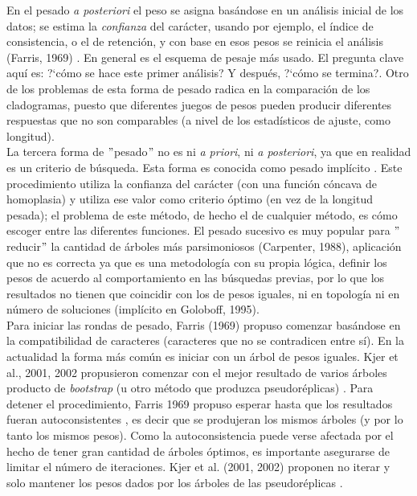 En el pesado \textit{a posteriori} el peso se asigna bas\'andose en un an\'alisis inicial de los datos; se estima la \textit{confianza} del car\'acter, usando por ejemplo, el \'indice de consistencia, o el de retenci\'on, y con base en esos pesos se reinicia el an\'alisis (Farris, 1969) \cite{Farris1969}. En general es el esquema de pesaje m\'as usado. El pregunta clave aqu\'i es: ?`c\'omo se hace este primer an\'alisis? Y despu\'es, ?`c\'omo se termina?. Otro de los problemas de esta forma de pesado radica en la comparaci\'on de los cladogramas, puesto que diferentes juegos de pesos pueden producir diferentes respuestas que no son comparables (a nivel de los estad\'isticos de ajuste, como longitud).\\
La tercera forma de $"$pesado$"$ no es ni \textit{a priori}, ni \textit{a posteriori}, ya que en realidad es un criterio de b\'usqueda. Esta forma es conocida como pesado impl\'icito \cite{Goloboff1993}. Este procedimiento utiliza la confianza del car\'acter (con una funci\'on c\'oncava de homoplasia) y utiliza ese valor como criterio \'optimo (en vez de la longitud pesada); el problema de este m\'etodo, de hecho el de cualquier m\'etodo, es c\'omo escoger entre las diferentes funciones.
El pesado sucesivo es muy popular para $"$reducir$"$ la cantidad de \'arboles m\'as parsimoniosos (Carpenter, 1988), aplicaci\'on que no es correcta ya que es una metodolog\'ia con su propia l\'ogica, definir los pesos de acuerdo al comportamiento en las b\'usquedas previas, por lo que los resultados no tienen que coincidir con los de pesos iguales, ni en topolog\'ia ni en n\'umero de soluciones (impl\'icito en Goloboff, 1995).\\
Para iniciar las rondas de pesado, Farris (1969) propuso comenzar bas\'andose en la compatibilidad de caracteres (caracteres que no se contradicen entre s\'i). En la actualidad la forma m\'as com\'un es iniciar con un \'arbol de pesos iguales. Kjer et al., 2001, 2002 propusieron comenzar con el mejor resultado de varios \'arboles producto de \textit{bootstrap}
 (u otro m\'etodo que produzca pseudor\'eplicas) \cite{Kjer2001} \cite{kjer2002}.  Para detener el procedimiento, Farris 1969 propuso esperar hasta que los resultados fueran autoconsistentes \cite{Farris1969}, es decir que se produjeran los mismos \'arboles (y por lo tanto los mismos pesos). Como la autoconsistencia puede verse afectada por el hecho de tener gran cantidad de \'arboles \'optimos, es importante asegurarse de limitar el n\'umero de iteraciones. Kjer et al. (2001, 2002) proponen no iterar y solo mantener los pesos dados por los \'arboles de las pseudor\'eplicas  \cite{Kjer2001} \cite{kjer2002}.\\
